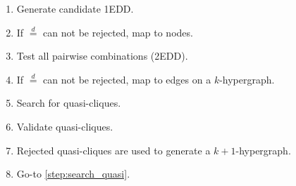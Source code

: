 \documentclass[10pt,compress]{beamer}
\newcommand{\eqdist}{\stackrel{d}{=}}
\begin{document}

\begin{frame}{}
    \begin{columns}
    \begin{column}{0.5\linewidth}
        \renewcommand{\theenumi}{\alph{enumi}}
        \begin{enumerate}
            \item Generate candidate 1EDD.
            \item If $\eqdist$ can not be rejected, map to nodes.
            \item Test all pairwise combinations (2EDD).
            \item If $\eqdist$ can not be rejected, map to edges on a $k$-hypergraph.
            \item Search for quasi-cliques\label{step:search_quasi}.
            \item Validate quasi-cliques.
            \item Rejected quasi-cliques are used to generate a $k+1$-hypergraph.
            \item Go-to \ref{step:search_quasi}.
        \end{enumerate}
    \end{column}
    \begin{column}{.5\linewidth}

\end{column}
\end{columns}
\end{frame}
\end{document}
